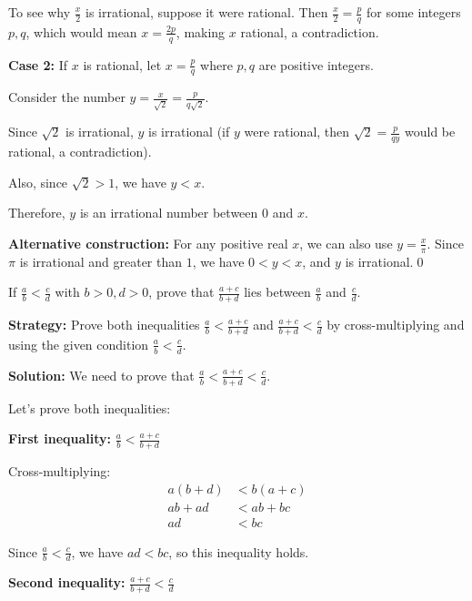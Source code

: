 To see why $\frac{x}{2}$ is irrational, suppose it were rational. Then $\frac{x}{2} = \frac{p}{q}$ for some integers $p, q$, which would mean $x = \frac{2p}{q}$, making $x$ rational, a contradiction.

\textbf{Case 2:} If $x$ is rational, let $x = \frac{p}{q}$ where $p, q$ are positive integers.

Consider the number $y = \frac{x}{\sqrt{2}} = \frac{p}{q\sqrt{2}}$.

Since $\sqrt{2}$ is irrational, $y$ is irrational (if $y$ were rational, then $\sqrt{2} = \frac{p}{qy}$ would be rational, a contradiction).

Also, since $\sqrt{2} > 1$, we have $y < x$.

Therefore, $y$ is an irrational number between $0$ and $x$.

\textbf{Alternative construction:}
For any positive real $x$, we can also use $y = \frac{x}{\pi}$. Since $\pi$ is irrational and greater than $1$, we have $0 < y < x$, and $y$ is irrational.\qed


\begin{problembox}
\begin{problemstatement}
If $\frac{a}{b} < \frac{c}{d}$ with $b > 0, d > 0$, prove that $\frac{a + c}{b + d}$ lies between $\frac{a}{b}$ and $\frac{c}{d}$.
\end{problemstatement}
\end{problembox}

\noindent\textbf{Strategy:} Prove both inequalities $\frac{a}{b} < \frac{a + c}{b + d}$ and $\frac{a + c}{b + d} < \frac{c}{d}$ by cross-multiplying and using the given condition $\frac{a}{b} < \frac{c}{d}$.

\bigskip\noindent\textbf{Solution:}
We need to prove that $\frac{a}{b} < \frac{a + c}{b + d} < \frac{c}{d}$.

Let's prove both inequalities:

\textbf{First inequality:} $\frac{a}{b} < \frac{a + c}{b + d}$

Cross-multiplying:
\begin{align*}
a(b + d) &< b(a + c) \\
ab + ad &< ab + bc \\
ad &< bc
\end{align*}

Since $\frac{a}{b} < \frac{c}{d}$, we have $ad < bc$, so this inequality holds.

\textbf{Second inequality:} $\frac{a + c}{b + d} < \frac{c}{d}$

